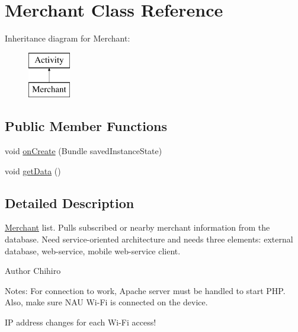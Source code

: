 \hypertarget{classapp_1_1localization_1_1_merchant}{\section{Merchant Class Reference}
\label{classapp_1_1localization_1_1_merchant}
}
Inheritance diagram for Merchant\-:\begin{figure}[H]
\begin{center}
\leavevmode
\includegraphics[height=2.000000cm]{classapp_1_1localization_1_1_merchant}
\end{center}
\end{figure}
\subsection*{Public Member Functions}
\begin{DoxyCompactItemize}
\item 
void \hyperlink{classapp_1_1localization_1_1_merchant_a85e87cb5ced88dff7c8173ecc4f636d1}{on\-Create} (Bundle saved\-Instance\-State)
\item 
void \hyperlink{classapp_1_1localization_1_1_merchant_a63e4aea9eb9a73812933b509b20b82e5}{get\-Data} ()
\end{DoxyCompactItemize}


\subsection{Detailed Description}
\hyperlink{classapp_1_1localization_1_1_merchant}{Merchant} list. Pulls subscribed or nearby merchant information from the database. Need service-\/oriented architecture and needs three elements\-: external database, web-\/service, mobile web-\/service client. \begin{DoxyAuthor}{Author}
Chihiro
\end{DoxyAuthor}
Notes\-: For connection to work, Apache server must be handled to start P\-H\-P. Also, make sure N\-A\-U Wi-\/\-Fi is connected on the device.

I\-P address changes for each Wi-\/\-Fi access! 

